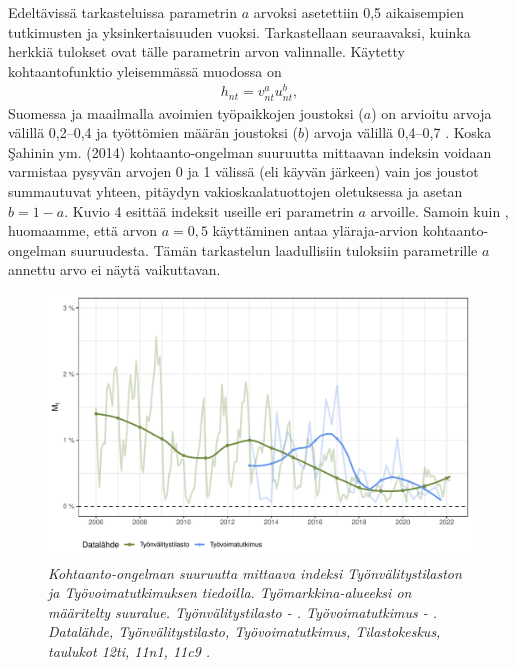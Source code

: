 \documentclass[12pt]{article}
\newcommand{\lastdatamonth}{\unskip}
\newcommand{\firstdatamonth}{\unskip}
\newcommand{\lastdataquarter}{\unskip}
\newcommand{\firstdataquarter}{\unskip}
\newcommand{\newcaption}[1]{\caption{\textit{\footnotesize{#1}}}}
\begin{document}
Edeltävissä tarkasteluissa parametrin $a$ arvoksi asetettiin 0,5 aikaisempien tutkimusten ja yksinkertaisuuden vuoksi. Tarkastellaan seuraavaksi, kuinka herkkiä tulokset ovat tälle parametrin arvon valinnalle. Käytetty kohtaantofunktio yleisemmässä muodossa on 
\begin{align}
h_{nt}=v_{nt}^au_{nt}^b,
\end{align}
Suomessa ja maailmalla avoimien työpaikkojen joustoksi ($a$) on arvioitu arvoja välillä 0,2–0,4 ja työttömien määrän joustoksi ($b$) arvoja välillä 0,4–0,7 \cite{lahtonen2006matching, petrongolo2001looking}. Koska Şahinin ym. (2014) kohtaanto-ongelman suuruutta mittaavan indeksin voidaan varmistaa pysyvän arvojen 0 ja 1 välissä (eli käyvän järkeen) vain jos joustot summautuvat yhteen, pitäydyn vakioskaalatuottojen oletuksessa ja asetan $b = 1-a$. Kuvio 4 esittää indeksit useille eri parametrin $a$ arvoille. Samoin kuin , huomaamme, että arvon $a = 0,5$ käyttäminen antaa yläraja-arvion kohtaanto-ongelman suuruudesta. Tämän tarkastelun laadullisiin tuloksiin parametrille $a$ annettu arvo ei näytä vaikuttavan. 

\begin{figure}
\centering
\includegraphics[scale = 0.7]{../kuviot/indeksi_suuralueittain.pdf}
    \newcaption{Kohtaanto-ongelman suuruutta mittaava indeksi Työnvälitystilaston ja Työvoimatutkimuksen tiedoilla. Työmarkkina-alueeksi on määritelty suuralue.  Työnvälitystilasto \protect \firstdatamonth \phantom{}  - \protect\lastdatamonth. Työvoimatutkimus \protect \firstdataquarter \phantom{} - \protect\lastdataquarter. Datalähde, Työnvälitystilasto, Työvoimatutkimus, Tilastokeskus, taulukot 12ti, 11n1, 11c9  \protect \cite{svt2011}.}
   \label{fig:ld0923g}
\end{figure}
\end{document}
